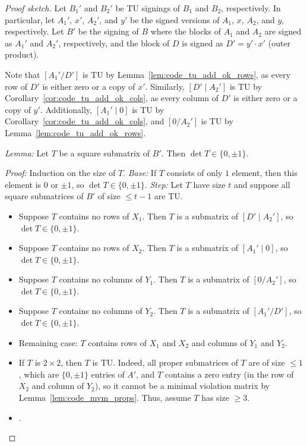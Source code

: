 \begin{proof}[Proof sketch]

  Let $B_{1}'$ and $B_{2}'$ be TU signings of $B_{1}$ and $B_{2}$, respectively.
  In particular, let $A_{1}'$, $x'$, $A_{2}'$, and $y'$ be the signed versions of $A_{1}$, $x$, $A_{2}$, and $y$, respectively.
  Let $B'$ be the signing of $B$ where the blocks of $A_{1}$ and $A_{2}$ are signed as $A_{1}'$ and $A_{2}'$, respectively, and the block of $D$ is signed as $D' = y' \cdot x'$ (outer product).

  Note that $\left[ A_{1}' / D' \right]$ is TU by Lemma~\ref{lem:code_tu_add_ok_rows}, as every row of $D'$ is either zero or a copy of $x'$.
  Similarly, $\left[D' \mid A_{2}' \right]$ is TU by Corollary~\ref{cor:code_tu_add_ok_cols}, as every column of $D'$ is either zero or a copy of $y'$.
  Additionally, $\left[ A_{1}' \mid 0 \right]$ is TU by Corollary~\ref{cor:code_tu_add_ok_cols}, and $\left[ 0 / A_{2}' \right]$ is TU by Lemma~\ref{lem:code_tu_add_ok_rows}.


  \emph{Lemma:} Let $T$ be a square submatrix of $B'$. Then $\det T \in \{0, \pm 1\}$.

  \emph{Proof:} Induction on the size of $T$.
  \emph{Base:} If $T$ consists of only $1$ element, then this element is $0$ or $\pm 1$, so $\det T \in \{0, \pm 1\}$.
  \emph{Step:} Let $T$ have size $t$ and suppose all square submatrices of $B'$ of size $\leq t - 1$ are TU.
  \begin{itemize}
    \item Suppose $T$ contains no rows of $X_{1}$. Then $T$ is a submatrix of $\left[D' \mid A_{2}' \right]$, so $\det T \in \{0, \pm 1\}$.
    \item Suppose $T$ contains no rows of $X_{2}$. Then $T$ is a submatrix of $\left[A_{1}' \mid 0 \right]$, so $\det T \in \{0, \pm 1\}$.
    \item Suppose $T$ contains no columns of $Y_{1}$. Then $T$ is a submatrix of $\left[0 / A_{2}' \right]$, so $\det T \in \{0, \pm 1\}$.
    \item Suppose $T$ contains no columns of $Y_{2}$. Then $T$ is a submatrix of $\left[ A_{1}' / D' \right]$, so $\det T \in \{0, \pm 1\}$.
    \item Remaining case: $T$ contains rows of $X_{1}$ and $X_{2}$ and columns of $Y_{1}$ and $Y_{2}$.
    \item If $T$ is $2 \times 2$, then $T$ is TU. Indeed, all proper submatrices of $T$ are of size $\leq 1$, which are $\{0, \pm 1\}$ entries of $A'$, and $T$ contains a zero entry (in the row of $X_{2}$ and column of $Y_{2}$), so it cannot be a minimal violation matrix by Lemma~\ref{lem:code_mvm_props}. Thus, assume $T$ has size $\geq 3$.
    \item .
  \end{itemize}
\end{proof}

